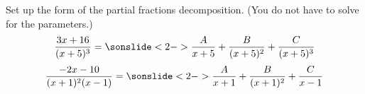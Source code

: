 \begin{frame}[t]Set up the form of the partial fractions decomposition. (You do not have to solve for the parameters.)
\[\frac{3x+16}{(x+5)^3}=\sonslide<2->{\frac{A}{x+5}+\frac{B}{(x+5)^2}+\frac{C}{(x+5)^3}}\]
\vfill
\[\frac{-2x-10}{(x+1)^2(x-1)}=\sonslide<2->{\frac{A}{x+1}+\frac{B}{(x+1)^2}+\frac{C}{x-1}}\]
\vfill
\end{frame}

